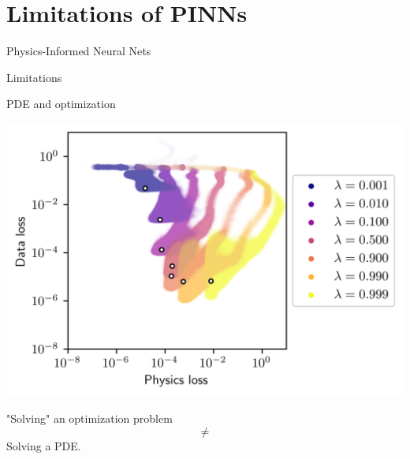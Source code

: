 \documentclass[aspectratio=169,compress,12pt,dvipsnames]{beamer}
\begin{document}
\section{Limitations of PINNs}

\begin{frame}
  \vfill
  { Physics-Informed Neural Nets}

  { Limitations}
  \vfill
\end{frame}

\begin{frame}{PDE and optimization}
  \vfill
  \begin{minipage}{.38\textwidth}
    \includegraphics[width=\textwidth]{pareto_front.png}
  \end{minipage}%
  \hfill
  \begin{minipage}{.58\textwidth}
    \centering
    "Solving" an optimization problem
    \[
      \neq
    \]
    Solving a PDE.
  \end{minipage}
  \vfill
\end{frame}
\end{document}
